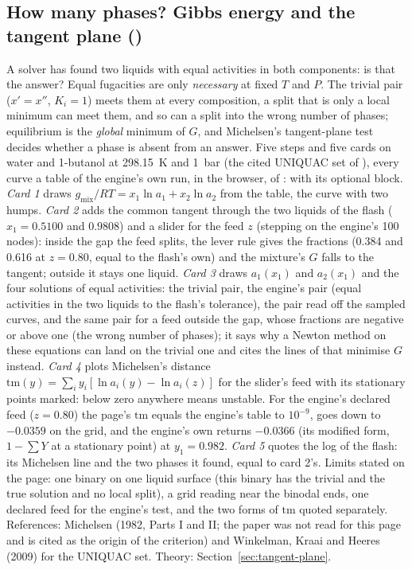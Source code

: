 \documentclass[11pt,a4paper]{article}
\begin{document}
\subsection*{How many phases? Gibbs energy and the tangent plane \quad()}\label{sec:edu-how-many-phases}
A solver has found two liquids with equal activities in both components: is that the answer?  Equal fugacities are
only \emph{necessary} at fixed $T$ and $P$.  The trivial pair ($x'=x''$, $K_i=1$) meets them at every composition, a
split that is only a local minimum can meet them, and so can a split into the wrong number of phases; equilibrium is
the \emph{global} minimum of $G$, and Michelsen's tangent-plane test decides whether a phase is absent from an answer.
Five steps and five cards on water and 1-butanol at 298.15~K and 1~bar (the cited UNIQUAC set of
), every curve a table of the engine's own run, in the browser, of
:  with its optional  block.
\emph{Card 1} draws $g_\mathrm{mix}/RT = x_1\ln a_1 + x_2\ln a_2$ from the  table, the curve with two
humps.  \emph{Card 2} adds the common tangent through the two liquids of the flash ($x_1 = 0.5100$ and $0.9808$) and a
slider for the feed $z$ (stepping on the engine's 100 nodes): inside the gap the feed splits, the lever rule gives the
fractions (0.384 and 0.616 at $z = 0.80$, equal to the flash's own) and the mixture's $G$ falls to the tangent;
outside it stays one liquid.  \emph{Card 3} draws $a_1(x_1)$ and $a_2(x_1)$ and the four solutions of equal activities:
the trivial pair, the engine's pair (equal activities in the two liquids to the flash's tolerance), the pair read off
the sampled curves, and the same pair for a feed outside the gap, whose fractions are negative or above one (the wrong
number of phases); it says why a Newton method on these equations can land on the trivial one and cites the lines of
 that minimise $G$ instead.  \emph{Card 4} plots Michelsen's distance
$\mathrm{tm}(y) = \sum_i y_i[\ln a_i(y) - \ln a_i(z)]$ for the slider's feed with its stationary points marked: below
zero anywhere means unstable.  For the engine's declared feed ($z = 0.80$) the page's $\mathrm{tm}$ equals the engine's
 table to $10^{-9}$, goes down to $-0.0359$ on the grid, and the engine's own  returns
$-0.0366$ (its modified form, $1 - \sum Y$ at a stationary point) at $y_1 = 0.982$.  \emph{Card 5} quotes the log of the
flash: its Michelsen line and the two phases it found, equal to card 2's.  Limits stated on the page: one binary on one
liquid surface (this binary has the trivial and the true solution and no local split), a grid reading near the binodal
ends, one declared feed for the engine's test, and the two forms of $\mathrm{tm}$ quoted separately.  References:
Michelsen (1982, Parts I and II; the paper was not read for this page and is cited as the origin of the criterion) and
Winkelman, Kraai and Heeres (2009) for the UNIQUAC set.  Theory: Section~\ref{sec:tangent-plane}.
\end{document}
